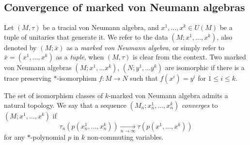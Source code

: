\documentclass[11pt]{amsart}
\theoremstyle{definition}
\theoremstyle{remark}
\theoremstyle{definition}
\begin{document}
\subsection{Convergence of marked von Neumann algebras}\label{subsec:marked}
Let $(M, \tau)$ be a tracial von Neumann algebra, and $x^1, \dots, x^k \in  U(M)$ be a tuple of unitaries that generate it.
We refer to the data $( M ; x^1, \dots, x^k)$, also denoted by $(M; \bar x)$ as a \emph{marked von Neumann algebra}, or simply refer to $\bar{x}=(x^1, \dots, x^k)$ as a \emph{tuple}, when $( M, \tau)$ is clear from the context.
Two marked von Neumann algebras $(M; x^1, \dots x^k)$, $(N; y^1,\dots y^k)$ are isomorphic if there is a trace preserving $*$-isomorphism $f: M \to N$ such that $f(x^i) = y^i$ for $1 \leq i \leq k$.

The set of isomorphism classes of $k$-marked von Neumann algebra admits a natural topology. We say that a sequence  $( M _n; x_n^1, \dots, x_n^k)$ \emph{converges} to  $( M ; x^1, \dots, x^k)$ if
\[
    \tau_n(p(x_n^1 ,...,x_n^k))\xrightarrow[n \to \infty]{} \tau(p(x^1 ,...,x^k))
\]
for any $*$-polynomial  $p$ in $k$ non-commuting variables. 
\end{document}
